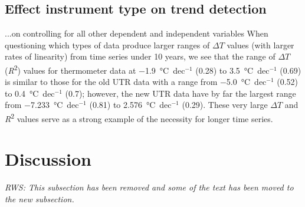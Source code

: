 \documentclass{ametsoc}
\begin{document}
\subsection{Effect instrument type on trend detection}
...on controlling for all other dependent and independent variables
When questioning which types of data produce larger ranges of $\Delta T$ values (with larger rates of linearity) from time series under 10 years, we see that the range of $\Delta T$ (\emph{R}\textsuperscript{2}) values for thermometer data at \SI{-1.9}{\degreeCelsius}~dec$^{-1}$ (0.28) to \SI{3.5}{\degreeCelsius}~dec$^{-1}$ (0.69) is similar to those for the old UTR data with a range from \SI{-5.0}{\degreeCelsius}~dec$^{-1}$ (0.52) to \SI{0.4}{\degreeCelsius}~dec$^{-1}$ (0.7); however, the new UTR data have by far the largest range from \SI{-7.233}{\degreeCelsius}~dec$^{-1}$ (0.81) to \SI{2.576}{\degreeCelsius}~dec$^{-1}$ (0.29). These very large $\Delta T$ and \emph{R}\textsuperscript{2} values serve as a strong example of the necessity for longer time series.




\section{Discussion}

\emph{RWS: This subsection has been removed and some of the text has been moved to the new subsection.}
\end{document}
